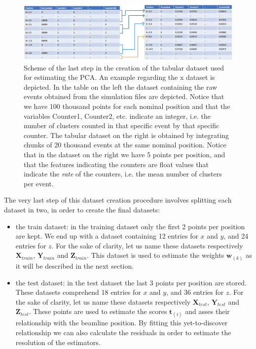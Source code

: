 \begin{figure}
    \centering
    \includegraphics[width=\textwidth]{figures/tabular_dataset.png}
    \caption{Scheme of the last step in the creation of the tabular dataset used for estimating the PCA. An example regarding the x dataset is depicted. In the table on the left the dataset containing the raw events obtained from the simulation files are depicted. Notice that we have 100 thousand points for each nominal position and that the variables Counter1, Counter2, etc. indicate an integer, i.e. the number of clusters counted in that specific event by that specific counter. The tabular dataset on the right is obtained by integrating chunks of 20 thousand events at the same nominal position. Notice that in the dataset on the right we have 5 points per position, and that the features indicating the counters are float values that indicate the \textit{rate} of the counters, i.e. the mean number of clusters per event.}
    \label{fig:tabular_dataset}
\end{figure}

The very last step of this dataset creation procedure involves splitting each dataset in two, in order to create the final datasets: 
\begin{itemize}
    \item the train dataset: in the training dataset only the first 2 points per position are kept. We end up with a dataset containing 12 entries for $x$ and $y$, and 24 entries for $z$. For the sake of clarity, let us name these datasets respectively $\mathbf{X}_{train}$, $\mathbf{Y}_{train}$ and $\mathbf{Z}_{train}$.  This dataset is used to estimate the weights $\mathbf{w}_{(k)}$ as it will be described in the next section.
    \item the test dataset: in the test dataset the last 3 points per position are stored. These datasets comprehend 18 entries for $x$ and $y$, and 36 entries for $z$. For the sake of clarity, let us name these datasets respectively $\mathbf{X}_{test}$, $\mathbf{Y}_{test}$ and $\mathbf{Z}_{test}$. These points are used to estimate the scores $\mathbf{t}_{(i)}$ and asses their relationship with the beamline position. By fitting this yet-to-discover relationship we can also calculate the residuals in order to estimate the resolution of the estimators.
\end{itemize}



